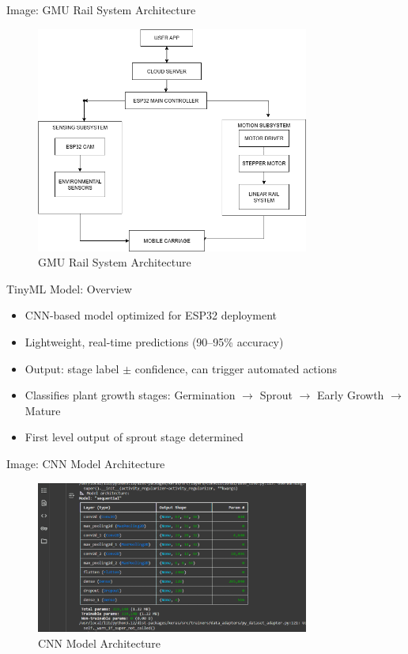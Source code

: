 \documentclass{beamer}
\begin{document}
\begin{frame}{Image: GMU Rail System Architecture}
    \begin{figure}
        \centering
        \includegraphics[width=0.8\textwidth]{rail3.drawio.png}
        \caption{GMU Rail System Architecture}
    \end{figure}
\end{frame}

\begin{frame}{TinyML Model: Overview}
    \begin{itemize}
        \item CNN-based model optimized for ESP32 deployment
        \item Lightweight, real-time predictions (90–95\% accuracy)
        \item Output: stage label $\pm$ confidence, can trigger automated actions
        \item Classifies plant growth stages: Germination $\rightarrow$ Sprout $\rightarrow$ Early Growth $\rightarrow$ Mature
        \item First level output of sprout stage determined
    \end{itemize}
\end{frame}

\begin{frame}{Image: CNN Model Architecture}
    \begin{figure}
        \centering
        \includegraphics[width=0.8\textwidth]{modelrender.png}
        \caption{CNN Model Architecture}
    \end{figure}
\end{frame}
\end{document}

